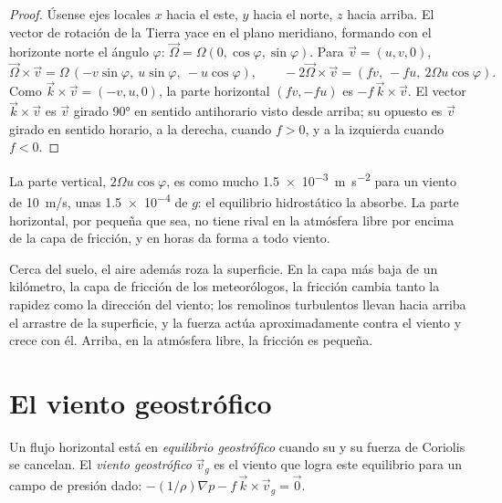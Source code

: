 \begin{proof}
Úsense ejes locales $x$ hacia el este, $y$ hacia el norte, $z$ hacia arriba. El vector de rotación de la Tierra yace en el plano meridiano, formando
con el horizonte norte el ángulo $\varphi$: $\vec\Omega =
\Omega(0, \cos\varphi, \sin\varphi)$. Para $\vec v = (u, v, 0)$,
\[
  \vec\Omega\times\vec v = \Omega\,(-v\sin\varphi,\ u\sin\varphi,\ -u\cos\varphi),
  \qquad -2\vec\Omega\times\vec v = (f v,\ -f u,\ 2\Omega u\cos\varphi).
\]
Como $\vec k\times\vec v = (-v, u, 0)$, la parte horizontal $(fv, -fu)$ es
$-f\,\vec k\times\vec v$. El vector $\vec k\times\vec v$ es $\vec v$ girado \ang{90} en sentido antihorario visto desde arriba; su opuesto es $\vec v$ girado en sentido horario, a la derecha, cuando $f > 0$, y a la izquierda cuando $f < 0$.
\end{proof}

La parte vertical, $2\Omega u\cos\varphi$, es como mucho \qty{1.5e-3}{m.s^{-2}} para un viento de \qty{10}{m/s}, unas \num{1.5e-4} de $g$: el equilibrio hidrostático la absorbe. La parte horizontal, por pequeña que sea, no tiene rival en la atmósfera libre por encima de la capa de fricción, y en horas da forma a todo viento.

Cerca del suelo, el aire además roza la superficie. En la capa más baja de un kilómetro, la capa de fricción de los meteorólogos, la fricción cambia tanto la rapidez como la dirección del viento; los remolinos turbulentos llevan hacia arriba el arrastre de la superficie, y la fuerza actúa aproximadamente contra el viento y crece con él. Arriba, en la atmósfera libre, la fricción es pequeña.

\section{El viento geostrófico}\label{sec:b1:atmospheric-circulation:geostrophic}

\begin{definition}\label{def:b1:atmospheric-circulation:geostrophic}
Un flujo horizontal está en \emph{equilibrio geostrófico} cuando su  y su fuerza de Coriolis se cancelan. El \emph{viento
geostrófico} $\vec v_g$ es el viento que logra este equilibrio para un campo de presión dado: $-(1/\rho)\nabla p - f\,\vec k\times\vec v_g = \vec 0$.
\end{definition}

